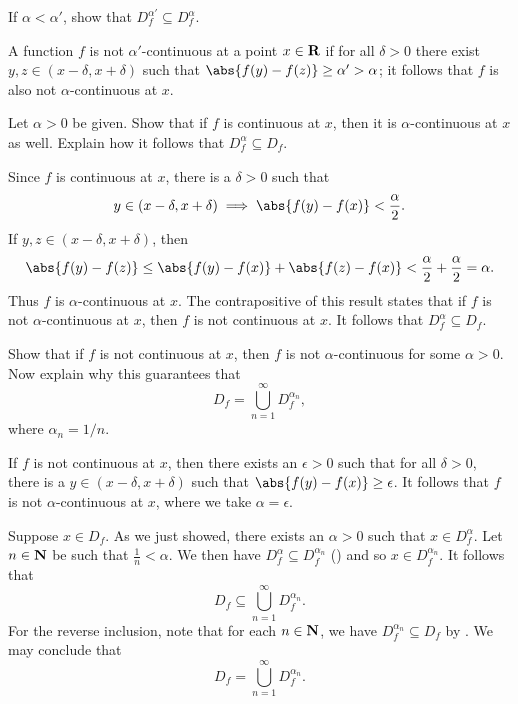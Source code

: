 \documentclass{lew98_solutions}
\begin{document}
\begin{exercise}
\label{ex:4.6.9}
    If \( \alpha < \alpha' \), show that \( D_f^{\alpha'} \subseteq D_f^{\alpha} \).
\end{exercise}

\begin{solution}
    A function \( f \) is not \( \alpha' \)-continuous at a point \( x \in \mathbf{R} \) if for all \( \delta > 0 \) there exist \( y, z \in (x - \delta, x + \delta) \) such that \( \abs{f(y) - f(z)} \geq \alpha' > \alpha \); it follows that \( f \) is also not \( \alpha \)-continuous at \( x \).
\end{solution}

\begin{exercise}
\label{ex:4.6.10}
    Let \( \alpha > 0 \) be given. Show that if \( f \) is continuous at \( x \), then it is \( \alpha \)-continuous at \( x \) as well. Explain how it follows that \( D_f^{\alpha} \subseteq D_f \).
\end{exercise}

\begin{solution}
    Since \( f \) is continuous at \( x \), there is a \( \delta > 0 \) such that
    \[
        y \in (x - \delta, x + \delta) \implies \abs{f(y) - f(x)} < \frac{\alpha}{2}.
    \]
    If \( y, z \in (x - \delta, x + \delta) \), then
    \[
        \abs{f(y) - f(z)} \leq \abs{f(y) - f(x)} + \abs{f(z) - f(x)} < \frac{\alpha}{2} + \frac{\alpha}{2} = \alpha.
    \]
    Thus \( f \) is \( \alpha \)-continuous at \( x \). The contrapositive of this result states that if \( f \) is not \( \alpha \)-continuous at \( x \), then \( f \) is not continuous at \( x \). It follows that \( D_f^{\alpha} \subseteq D_f \).
\end{solution}

\begin{exercise}
\label{ex:4.6.11}
    Show that if \( f \) is not continuous at \( x \), then \( f \) is not \( \alpha \)-continuous for some \( \alpha > 0 \). Now explain why this guarantees that
    \[
        D_f = \bigcup_{n=1}^{\infty} D_f^{\alpha_n},
    \]
    where \( \alpha_n = 1/n \).
\end{exercise}

\begin{solution}
    If \( f \) is not continuous at \( x \), then there exists an \( \epsilon > 0 \) such that for all \( \delta > 0 \), there is a \( y \in (x - \delta, x + \delta) \) such that \( \abs{f(y) - f(x)} \geq \epsilon \). It follows that \( f \) is not \( \alpha \)-continuous at \( x \), where we take \( \alpha = \epsilon \).

    Suppose \( x \in D_f \). As we just showed, there exists an \( \alpha > 0 \) such that \( x \in D_f^{\alpha} \). Let \( n \in \mathbf{N} \) be such that \( \tfrac{1}{n} < \alpha \). We then have \( D_f^{\alpha} \subseteq D_f^{\alpha_n} \) () and so \( x \in D_f^{\alpha_n} \). It follows that
    \[
        D_f \subseteq \bigcup_{n=1}^{\infty} D_f^{\alpha_n}.
    \]
    For the reverse inclusion, note that for each \( n \in \mathbf{N} \), we have \( D_f^{\alpha_n} \subseteq D_f \) by . We may conclude that
    \[
        D_f = \bigcup_{n=1}^{\infty} D_f^{\alpha_n}.
    \]
\end{solution}
\end{document}
